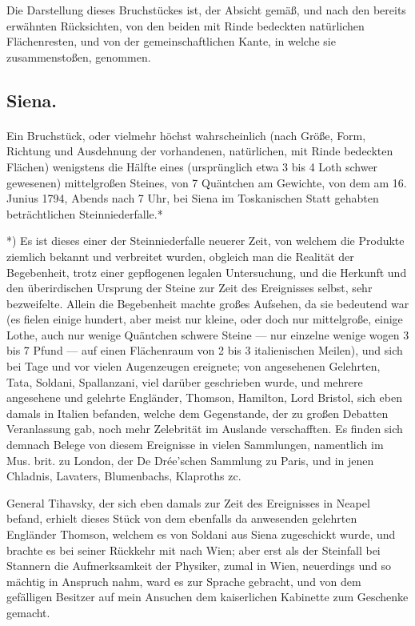 \documentclass[a4paper, 11pt, oneside, german]{article}
\begin{document}
Die Darstellung dieses Bruchstückes ist, der Absicht gemäß, und nach den bereits erwähnten Rücksichten, von den beiden mit Rinde bedeckten natürlichen Flächenresten, und von der gemeinschaftlichen Kante, in welche sie zusammenstoßen, genommen.

\subsection{Siena.}
\paragraph{}
Ein Bruchstück, oder vielmehr höchst wahrscheinlich (nach Größe, Form, Richtung und Ausdehnung der vorhandenen, natürlichen, mit Rinde bedeckten Flächen) wenigstens die Hälfte eines (ursprünglich etwa 3 bis 4 Loth schwer gewesenen) mittelgroßen Steines, von 7 Quäntchen am Gewichte, von dem am 16. Junius 1794, Abends nach 7 Uhr, bei Siena im Toskanischen Statt gehabten beträchtlichen Steinniederfalle.*

*) Es ist dieses einer der Steinniederfalle neuerer Zeit, von welchem die Produkte ziemlich bekannt und verbreitet wurden, obgleich man die Realität der Begebenheit, trotz einer gepflogenen legalen Untersuchung, und die Herkunft und den überirdischen Ursprung der Steine zur Zeit des Ereignisses selbst, sehr bezweifelte. Allein die Begebenheit machte großes Aufsehen, da sie bedeutend war (es fielen einige hundert, aber meist nur kleine, oder doch nur mittelgroße, einige Lothe, auch nur wenige Quäntchen schwere Steine --- nur einzelne wenige wogen 3 bis 7 Pfund --- auf einen Flächenraum von 2 bis 3 italienischen Meilen), und sich bei Tage und vor vielen Augenzeugen ereignete; von angesehenen Gelehrten, Tata, Soldani, Spallanzani, viel darüber geschrieben wurde, und mehrere angesehene und gelehrte Engländer, Thomson, Hamilton, Lord Bristol, sich eben damals in Italien befanden, welche dem Gegenstande, der zu großen Debatten Veranlassung gab, noch mehr Zelebrität im Auslande verschafften. Es finden sich demnach Belege von diesem Ereignisse in vielen Sammlungen, namentlich im Mus. brit. zu London, der De Drée'schen Sammlung zu Paris, und in jenen Chladnis, Lavaters, Blumenbachs, Klaproths zc.

General Tihavsky, der sich eben damals zur Zeit des Ereignisses in Neapel befand, erhielt dieses Stück von dem ebenfalls da anwesenden gelehrten Engländer Thomson, welchem es von Soldani aus Siena zugeschickt wurde, und brachte es bei seiner Rückkehr mit nach Wien; aber erst als der Steinfall bei Stannern die Aufmerksamkeit der Physiker, zumal in Wien, neuerdings und so mächtig in Anspruch nahm, ward es zur Sprache gebracht, und von dem gefälligen Besitzer auf mein Ansuchen dem kaiserlichen Kabinette zum Geschenke gemacht.
\end{document}
